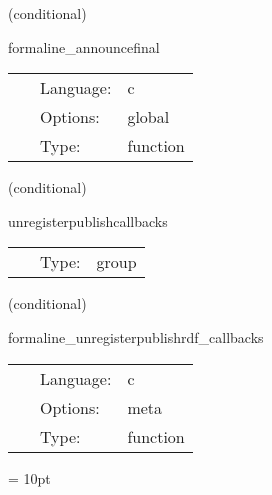 \vspace{5mm}

   (conditional) 

\hspace{5mm} formaline\_announcefinal 

\hspace{5mm}{\it put some meta information about the current run into permanent storage } 


\hspace{5mm}

 \begin{tabular*}{160mm}{cll} 
~ & Language:  & c \\ 
~ & Options:  & global \\ 
~ & Type:  & function \\ 
\end{tabular*} 


\vspace{5mm}

\noindent {\bf }   (conditional) 

\hspace{5mm} unregisterpublishcallbacks 

\hspace{5mm}{\it tell cactus that this group exists, but is not scheduled from here } 


\hspace{5mm}

 \begin{tabular*}{160mm}{cll} 
~ & Type:  & group \\ 
\end{tabular*} 


\vspace{5mm}

   (conditional) 

\hspace{5mm} formaline\_unregisterpublishrdf\_callbacks 

\hspace{5mm}{\it unregister rdf callbacks for the publish api } 


\hspace{5mm}

 \begin{tabular*}{160mm}{cll} 
~ & Language:  & c \\ 
~ & Options:  & meta \\ 
~ & Type:  & function \\ 
\end{tabular*} 



\vspace{5mm}\parskip = 10pt 

